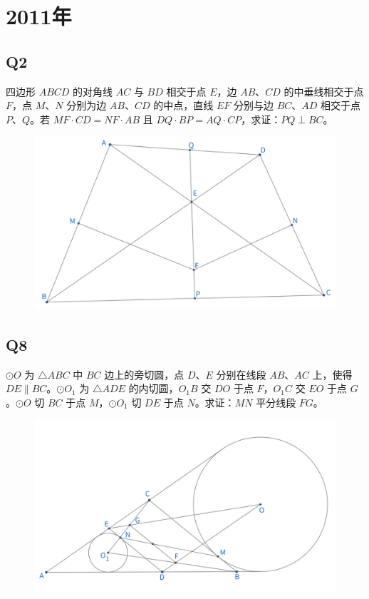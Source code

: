 \documentclass{article}
\begin{document}
\newpage 
\section{2011年}
\subsection{Q2}
四边形 $ABCD$ 的对角线 $AC$ 与 $BD$ 相交于点 $E$，边 $AB$、$CD$ 的中垂线相交于点 $F$，点 $M$、$N$ 分别为边 $AB$、$CD$ 的中点，直线 $EF$ 分别与边 $BC$、$AD$ 相交于点 $P$、$Q$。若 $MF \cdot CD = NF \cdot AB$ 且 $DQ \cdot BP = AQ \cdot CP$，求证：$PQ \perp BC$。
\begin{figure}[htbp]
    \centering
    \includegraphics[width=0.7\linewidth]{figures/女子赛11年Q2.png}
\end{figure}

\subsection{Q8}
$\odot O$ 为 $\triangle ABC$ 中 $BC$ 边上的旁切圆，点 $D$、$E$ 分别在线段 $AB$、$AC$ 上，使得 $DE \parallel BC$。$\odot O_1$ 为 $\triangle ADE$ 的内切圆，$O_1B$ 交 $DO$ 于点 $F$，$O_1C$ 交 $EO$ 于点 $G$。$\odot O$ 切 $BC$ 于点 $M$，$\odot O_1$ 切 $DE$ 于点 $N$。求证：$MN$ 平分线段 $FG$。
\begin{figure}[htbp]
    \centering
    \includegraphics[width=0.7\linewidth]{figures/女子赛11年Q8.png}
\end{figure}
\end{document}

